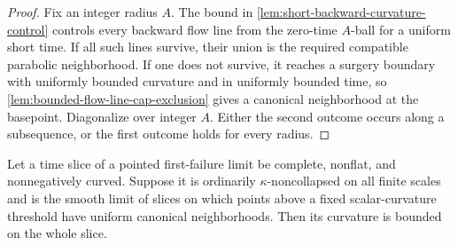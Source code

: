 \begin{proof}
Fix an integer radius $A$.  The bound in
\ref{lem:short-backward-curvature-control} controls every backward flow line
from the zero-time $A$-ball for a uniform short time.  If all such lines
survive, their union is the required compatible parabolic neighborhood.  If
one does not survive, it reaches a surgery boundary with uniformly bounded
curvature and in uniformly bounded time, so
\ref{lem:bounded-flow-line-cap-exclusion} gives a canonical neighborhood at
the basepoint.  Diagonalize over integer $A$.  Either the second outcome
occurs along a subsequence, or the first outcome holds for every radius.
\end{proof}

\begin{lemma}
\label{lem:first-failure-limit-slice-bounded-curvature}
\notready
Let a time slice of a pointed first-failure limit be complete, nonflat, and
nonnegatively curved.  Suppose it is ordinarily $\kappa$-noncollapsed on all
finite scales and is the smooth limit of slices on which points above a fixed
scalar-curvature threshold have uniform canonical neighborhoods.  Then its
curvature is bounded on the whole slice.
\end{lemma}

